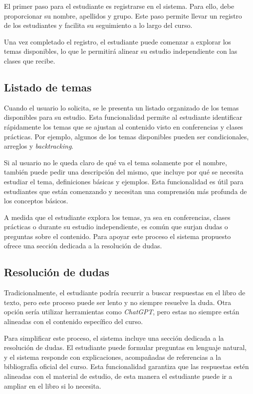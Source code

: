 \documentclass{article}
\begin{document}
El primer paso para el estudiante es registrarse en el sistema. Para ello, debe proporcionar su nombre, apellidos y grupo. Este paso permite llevar un registro de los estudiantes y facilita su seguimiento a lo largo del curso. 

Una vez completado el registro, el estudiante puede comenzar a explorar los temas disponibles, lo que le permitirá alinear su estudio independiente con las clases que recibe.

\subsection{Listado de temas}

Cuando el usuario lo solicita, se le presenta un listado organizado de los temas disponibles para su estudio. Esta funcionalidad permite al estudiante identificar rápidamente los temas que se ajustan al contenido visto en conferencias y clases prácticas. Por ejemplo, algunos de los temas disponibles pueden ser condicionales, arreglos y \textit{backtracking}.

Si al usuario no le queda claro de qué va el tema solamente por el nombre, también puede pedir una descripción del mismo, que incluye por qué se necesita estudiar el tema, definiciones básicas y ejemplos. Esta funcionalidad es útil para estudiantes que están comenzando y necesitan una comprensión más profunda de los conceptos básicos.

A medida que el estudiante explora los temas, ya sea en conferencias, clases prácticas o durante su estudio independiente, es común que surjan dudas o preguntas sobre el contenido. Para apoyar este proceso el sistema propuesto ofrece una sección dedicada a la resolución de dudas.

\subsection{Resolución de dudas}

Tradicionalmente, el estudiante podría recurrir a buscar respuestas en el libro de texto, pero este proceso puede ser lento y no siempre resuelve la duda. Otra opción sería utilizar herramientas como \textit{ChatGPT}, pero estas no siempre están alineadas con el contenido específico del curso.

Para simplificar este proceso, el sistema incluye una sección dedicada a la resolución de dudas. El estudiante puede formular preguntas en lenguaje natural, y el sistema responde con explicaciones, acompañadas de referencias a la bibliografía oficial del curso. Esta funcionalidad garantiza que las respuestas estén alineadas con el material de estudio, de esta manera el estudiante puede ir a ampliar en el libro si lo necesita. 
\end{document}
